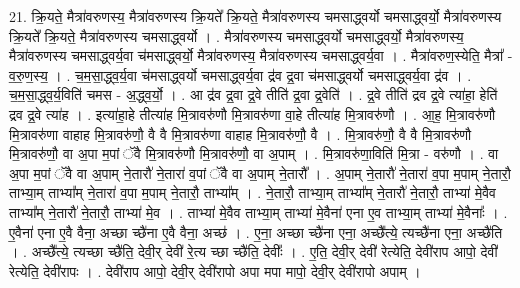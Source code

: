\documentclass[17pt]{extarticle}
\begin{document}
21. क्रि॒यते॒ मैत्रा॑वरुणस्य॒ मैत्रा॑वरुणस्य क्रि॒यते᳚ क्रि॒यते॒ मैत्रा॑वरुणस्य चमसाद्ध्वर्यो चमसाद्ध्वर्यो॒ मैत्रा॑वरुणस्य क्रि॒यते᳚ क्रि॒यते॒ मैत्रा॑वरुणस्य चमसाद्ध्वर्यो । . मैत्रा॑वरुणस्य चमसाद्ध्वर्यो चमसाद्ध्वर्यो॒ मैत्रा॑वरुणस्य॒ मैत्रा॑वरुणस्य चमसाद्ध्वर्य॒वा च॑मसाद्ध्वर्यो॒ मैत्रा॑वरुणस्य॒ मैत्रा॑वरुणस्य चमसाद्ध्वर्य॒वा । . मैत्रा॑वरुण॒स्येति॒ मैत्रा᳚ - व॒रु॒ण॒स्य॒ । . च॒म॒सा॒द्ध्व॒र्य॒वा च॑मसाद्ध्वर्यो चमसाद्ध्वर्य॒वा द्र॑व द्र॒वा च॑मसाद्ध्वर्यो चमसाद्ध्वर्य॒वा द्र॑व । . च॒म॒सा॒द्ध्व॒र्य॒विति॑ चमस - अ॒द्ध्व॒र्यो॒ । . आ द्र॑व द्र॒वा द्र॒वे तीति॑ द्र॒वा द्र॒वेति॑ । . द्र॒वे तीति॑ द्रव द्र॒वे त्या॑हा॒ हेति॑ द्रव द्र॒वे त्या॑ह । . इत्या॑हा॒हे तीत्या॑ह मि॒त्रावरु॑णौ मि॒त्रावरु॑णा वा॒हे तीत्या॑ह मि॒त्रावरु॑णौ । . आ॒ह॒ मि॒त्रावरु॑णौ मि॒त्रावरु॑णा वाहाह मि॒त्रावरु॑णौ॒ वै वै मि॒त्रावरु॑णा वाहाह मि॒त्रावरु॑णौ॒ वै । . मि॒त्रावरु॑णौ॒ वै वै मि॒त्रावरु॑णौ मि॒त्रावरु॑णौ॒ वा अ॒पा म॒पां ॅवै मि॒त्रावरु॑णौ मि॒त्रावरु॑णौ॒ वा अ॒पाम् । . मि॒त्रावरु॑णा॒विति॑ मि॒त्रा - वरु॑णौ । . वा अ॒पा म॒पां ॅवै वा अ॒पाम् ने॒तारौ॑ ने॒तारा॑ व॒पां ॅवै वा अ॒पाम् ने॒तारौ᳚ । . अ॒पाम् ने॒तारौ॑ ने॒तारा॑ व॒पा म॒पाम् ने॒तारौ॒ ताभ्या॒म् ताभ्या᳚म् ने॒तारा॑ व॒पा म॒पाम् ने॒तारौ॒ ताभ्या᳚म् । . ने॒तारौ॒ ताभ्या॒म् ताभ्या᳚म् ने॒तारौ॑ ने॒तारौ॒ ताभ्या॑ मे॒वैव ताभ्या᳚म् ने॒तारौ॑ ने॒तारौ॒ ताभ्या॑ मे॒व । . ताभ्या॑ मे॒वैव ताभ्या॒म् ताभ्या॑ मे॒वैना॑ एना ए॒व ताभ्या॒म् ताभ्या॑ मे॒वैनाः᳚ । . ए॒वैना॑ एना ए॒वै वैना॒ अच्छा च्छै॑ना ए॒वै वैना॒ अच्छ॑ । . ए॒ना॒ अच्छा च्छै॑ना एना॒ अच्छै᳚त्ये॒ त्यच्छै॑ना एना॒ अच्छै॑ति । . अच्छै᳚त्ये॒ त्यच्छा च्छै॑ति॒ देवी॒र् देवी॑ रे॒त्य च्छा च्छै॑ति॒ देवीः᳚ । . ए॒ति॒ देवी॒र् देवी॑ रेत्येति॒ देवी॑राप आपो॒ देवी॑ रेत्येति॒ देवी॑रापः । . देवी॑राप आपो॒ देवी॒र् देवी॑रापो अपा मपा मापो॒ देवी॒र् देवी॑रापो अपाम् । \newline
\end{document}

